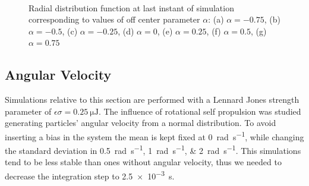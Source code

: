 \documentclass[../../master_thesis_np.tex]{subfiles}
\begin{document}
		\begin{figure}\ContinuedFloat
			\centering
			\\
			
			\caption{Radial distribution function at last instant of simulation corresponding to values of off center parameter $\alpha$: (a) $\alpha = -0.75$, (b) $\alpha = -0.5$, (c) $\alpha = -0.25$, (d) $\alpha = 0$, (e) $\alpha = 0.25$, (f) $\alpha = 0.5$, (g) $\alpha = 0.75$}
			\label{fig:lj_oc_rdf}
		\end{figure}
	
		
		\subsection{Angular Velocity}
		Simulations relative to this section are performed with a Lennard Jones strength parameter of $\epsilon \sigma = \SI{0.25}{\micro\joule}$.
		The influence of rotational self propulsion was studied generating particles' angular velocity from a normal distribution.
		To avoid inserting a bias in the system the mean is kept fixed at \SI{0}{\radian\per\second}, while changing the standard deviation in \qtylist{0.5; 1;2}{\radian\per\second}.
		This simulations tend to be less stable than ones without angular velocity, thus we needed to decrease the integration step to \SI{2.5 e-3}{\second}.
		
\end{document}
